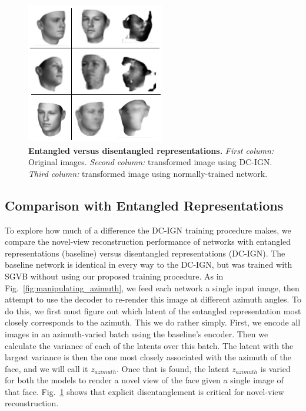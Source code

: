 \documentclass[12pt,twoside]{mitthesis}
\begin{document}
\begin{figure}[htbp]
\centering
\includegraphics{figures/entangled-disentangled-comparison.png}
\caption{\label{fig:pose_and_entangledcomparison}\textbf{Entangled
versus disentangled representations.} \emph{First column:} Original
images. \emph{Second column:} transformed image using DC-IGN.
\emph{Third column:} transformed image using normally-trained network.}
\end{figure}

\subsection{Comparison with Entangled
Representations}\label{comparison-with-entangled-representations}

To explore how much of a difference the DC-IGN training procedure makes,
we compare the novel-view reconstruction performance of networks with
entangled representations (baseline) versus disentangled representations
(DC-IGN). The baseline network is identical in every way to the DC-IGN,
but was trained with SGVB without using our proposed training procedure.
As in Fig.~\ref{fig:manipulating_azimuth}, we feed each network a single
input image, then attempt to use the decoder to re-render this image at
different azimuth angles. To do this, we first must figure out which
latent of the entangled representation most closely corresponds to the
azimuth. This we do rather simply. First, we encode all images in an
azimuth-varied batch using the baseline's encoder. Then we calculate the
variance of each of the latents over this batch. The latent with the
largest variance is then the one most closely associated with the
azimuth of the face, and we will call it $z_{azimuth}$. Once that is
found, the latent $z_{azimuth}$ is varied for both the models to
render a novel view of the face given a single image of that face.
Fig.~\ref{fig:pose_and_entangledcomparison} shows that explicit
disentanglement is critical for novel-view reconstruction.
\end{document}
